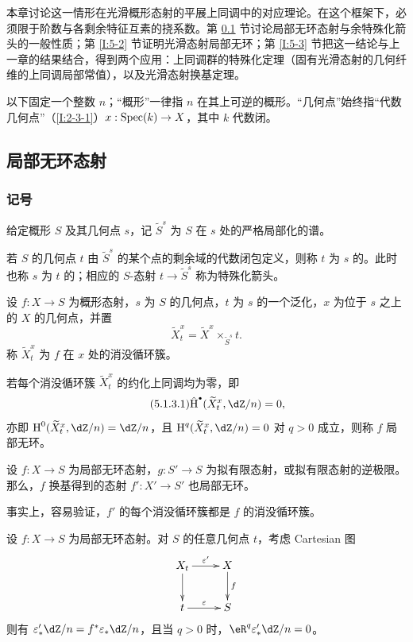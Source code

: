 本章讨论这一情形在光滑概形态射的平展上同调中的对应理论。在这个框架下，必须限于阶数与各剩余特征互素的挠系数。第 \ref{I:5-1} 节讨论局部无环态射与余特殊化箭头的一般性质；第 \ref{I:5-2} 节证明光滑态射局部无环；第 \ref{I:5-3} 节把这一结论与上一章的结果结合，得到两个应用：上同调群的特殊化定理（固有光滑态射的几何纤维的上同调局部常值），以及光滑态射换基定理。

以下固定一个整数 $n$；“概形”一律指 $n$ 在其上可逆的概形。“几何点”始终指“代数几何点”（\ref{I:2-3-1}）$x:\operatorname{Spec}(k)\to X$，其中 $k$ 代数闭。

\subsection{局部无环态射}\label{I:5-1}
\subsubsection{记号}\label{I:5-1-1}
给定概形 $S$ 及其几何点 $s$，记 $\widetilde S^s$ 为 $S$ 在 $s$ 处的严格局部化的谱。
\begin{definition}\label{I:5-1-2}
若 $S$ 的几何点 $t$ 由 $\widetilde S^s$ 的某个点的剩余域的代数闭包定义，则称 $t$ 为 $s$ 的。此时也称 $s$ 为 $t$ 的；相应的 $S$-态射 $t\to\widetilde S^s$ 称为特殊化箭头。
\end{definition}
\begin{definition}\label{I:5-1-3}
设 $f:X\to S$ 为概形态射，$s$ 为 $S$ 的几何点，$t$ 为 $s$ 的一个泛化，$x$ 为位于 $s$ 之上的 $X$ 的几何点，并置
\[
\widetilde X_t^x=\widetilde X^x\times_{\widetilde S^s}t.
\]
称 $\widetilde X_t^x$ 为 $f$ 在 $x$ 处的消没循环簇。

若每个消没循环簇 $\widetilde X_t^x$ 的约化上同调均为零，即
\begin{equation*}\tag{5.1.3.1}\label{I:eq:5-1-3-1}
\hat\h^\bullet(\widetilde X_t^x,\dZ/n)=0,
\end{equation*}
亦即 $\h^0(\widetilde X_t^x,\dZ/n)=\dZ/n$，且 $\h^q(\widetilde X_t^x,\dZ/n)=0$ 对 $q>0$ 成立，则称 $f$ 局部无环。
\end{definition}
\begin{lemma}\label{I:5-1-4}
设 $f:X\to S$ 为局部无环态射，$g:S'\to S$ 为拟有限态射，或拟有限态射的逆极限。那么，$f$ 换基得到的态射 $f':X'\to S'$ 也局部无环。
\end{lemma}
事实上，容易验证，$f'$ 的每个消没循环簇都是 $f$ 的消没循环簇。
\begin{lemma}\label{I:5-1-5}
设 $f:X\to S$ 为局部无环态射。对 $S$ 的任意几何点 $t$，考虑 Cartesian 图
\[\xymatrix{
X_t\ar[r]^-{\varepsilon'}\ar[d]&X\ar[d]^-f\\
t\ar[r]^-\varepsilon&S
}\]
则有 $\varepsilon'_*\dZ/n=f^*\varepsilon_*\dZ/n$，且当 $q>0$ 时，$\eR^q\varepsilon'_*\dZ/n=0$。
\end{lemma}
